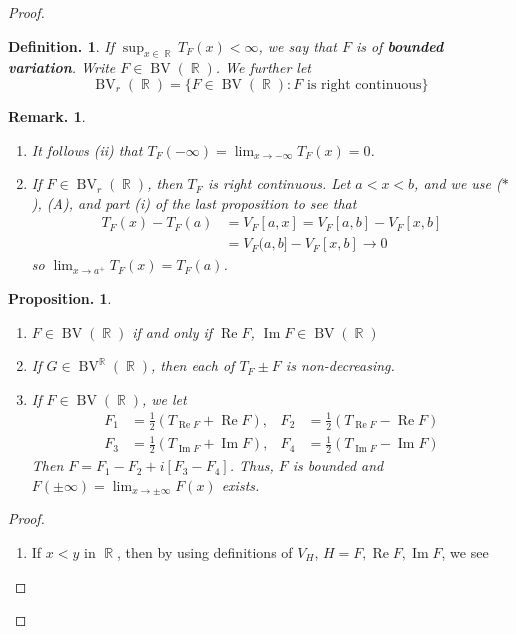 \documentclass[11pt, a4paper]{memoir}
\DeclareMathOperator{\R}{{\mathbb{R}}}
\theoremstyle{change}
\newtheorem{proposition}[theorem]{Proposition.}
\theoremstyle{plain}
\theoremstyle{nonumberplain}
\newtheorem{definition}{Definition.}
\newtheorem{remark}{Remark.}
\newtheorem{proof}{Proof}
\renewcommand{\Re}{\ensuremath{\operatorname{Re}}}
\renewcommand{\Im}{\ensuremath{\operatorname{Im}}}
\DeclareMathOperator{\BV}{BV}
\begin{document}
\begin{proof}
\begin{definition}
    If $\sup_{x\in\R}T_F(x)<\infty$, we say that $F$ is of \textbf{bounded variation}.
    Write $F\in\BV(\R)$.
    We further let
    \begin{equation*}
        \BV_r(\R)=\{F\in \BV(\R):F\text{ is right continuous}\}
    \end{equation*}
\end{definition}
\begin{remark}
    \begin{enumerate}[nl,r]
        \item It follows (ii) that $T_F(-\infty)=\lim_{x\to -\infty}T_F(x)=0$.
        \item If $F\in \BV_r(\R)$, then $T_F$ is right continuous.
            Let $a<x<b$, and we use ($*$), (A), and part (i) of the last proposition to see that
            \begin{align*}
                T_F(x)-T_F(a) &= V_F[a,x]=V_F[a,b]-V_F[x,b]\\
                              &= V_F(a,b]-V_F[x,b]\to 0
            \end{align*}
            so $\lim_{x\to a^+}T_F(x)=T_F(a)$.
    \end{enumerate}
\end{remark}
\begin{proposition}
    \begin{enumerate}[nl,r]
        \item $F\in\BV(\R)$ if and only if $\Re F$, $\Im F\in\BV(\R)$
        \item If $G\in\BV^{\R}(\R)$, then each of $T_F\pm F$ is non-decreasing.
        \item If $F\in\BV(\R)$, we let
            \begin{align*}
                F_1 &= \frac{1}{2}\left(T_{\Re F}+ \Re F\right), & F_2&=\frac{1}{2}\left(T_{\Re F}-\Re F\right)\\
                F_3 &= \frac{1}{2}\left(T_{\Im F}+ \Im F\right), & F_4&=\frac{1}{2}\left(T_{\Im F}-\Im F\right)
            \end{align*}
            Then $F=F_1-F_2+i[F_3-F_4]$.
            Thus, $F$ is bounded and $F(\pm\infty)=\lim_{x\to \pm\infty}F(x)$ exists.
    \end{enumerate}
\end{proposition}
\begin{proof}
    \begin{enumerate}[r]
        \item If $x<y$ in $\R$, then by using definitions of $V_H$, $H=F,\Re F,\Im F$, we see

\end{enumerate}
\end{proof}
\end{proof}
\end{document}
